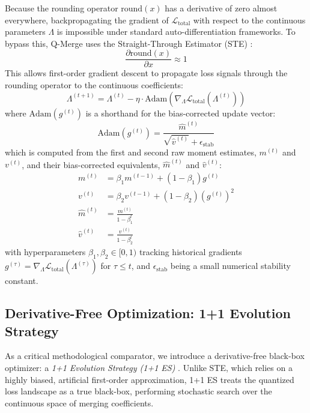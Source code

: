 Because the rounding operator $\text{round}(x)$ has a derivative of zero almost everywhere, backpropagating the gradient of $\mathcal{L}_{\text{total}}$ with respect to the continuous parameters $\Lambda$ is impossible under standard auto-differentiation frameworks. To bypass this, Q-Merge uses the Straight-Through Estimator (STE) \cite{bengio2013ste}:
\begin{equation}
    \frac{\partial \text{round}(x)}{\partial x} \approx 1
\end{equation}
This allows first-order gradient descent to propagate loss signals through the rounding operator to the continuous coefficients:
\begin{equation}
    \Lambda^{(t+1)} = \Lambda^{(t)} - \eta \cdot \text{Adam}\left( \nabla_{\Lambda} \mathcal{L}_{\text{total}}(\Lambda^{(t)}) \right)
\end{equation}
where $\text{Adam}(g^{(t)})$ is a shorthand for the bias-corrected update vector:
\begin{equation}
    \text{Adam}(g^{(t)}) = \frac{\hat{m}^{(t)}}{\sqrt{\hat{v}^{(t)}} + \epsilon_{\text{stab}}}
\end{equation}
which is computed from the first and second raw moment estimates, $m^{(t)}$ and $v^{(t)}$, and their bias-corrected equivalents, $\hat{m}^{(t)}$ and $\hat{v}^{(t)}$:
\begin{align}
    m^{(t)} &= \beta_1 m^{(t-1)} + (1 - \beta_1) g^{(t)} \\
    v^{(t)} &= \beta_2 v^{(t-1)} + (1 - \beta_2) (g^{(t)})^2 \\
    \hat{m}^{(t)} &= \frac{m^{(t)}}{1 - \beta_1^t} \\
    \hat{v}^{(t)} &= \frac{v^{(t)}}{1 - \beta_2^t}
\end{align}
with hyperparameters $\beta_1, \beta_2 \in [0, 1)$ tracking historical gradients $g^{(\tau)} = \nabla_{\Lambda} \mathcal{L}_{\text{total}}(\Lambda^{(\tau)})$ for $\tau \le t$, and $\epsilon_{\text{stab}}$ being a small numerical stability constant.

\subsection{Derivative-Free Optimization: 1+1 Evolution Strategy}
As a critical methodological comparator, we introduce a derivative-free black-box optimizer: a \emph{1+1 Evolution Strategy (1+1 ES)} \cite{rechenberg1978es}. Unlike STE, which relies on a highly biased, artificial first-order approximation, 1+1 ES treats the quantized loss landscape as a true black-box, performing stochastic search over the continuous space of merging coefficients.

